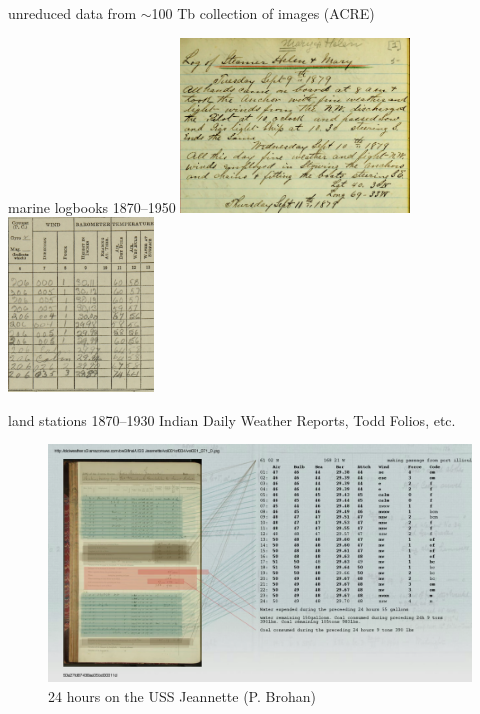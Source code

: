 \documentclass{beamer}
\begin{document}
\begin{frame}

    \begin{center}
        unreduced data from $\sim$100 Tb collection of images (ACRE)
    \end{center}


    \begin{beamerboxesrounded}{marine logbooks 1870--1950}
        \includegraphics[height=12.5em]{img/mary-1879}
        \hspace{0.5em}
        \includegraphics[height=12.5em]{img/idaho-1944}
    \end{beamerboxesrounded}
    \vfill

    \begin{beamerboxesrounded}{land stations 1870--1930}
        Indian Daily Weather Reports, Todd Folios, etc.
    \end{beamerboxesrounded}

\end{frame}

\begin{frame}[fragile]
    \begin{example}
        \begin{figure}
            \includegraphics[width=\textwidth]{img/2019-07-30-jeannette}
            \caption{
                24 hours on the USS Jeannette (P. Brohan)
            }
        \end{figure}
    \end{example}
\end{frame}
\end{document}
